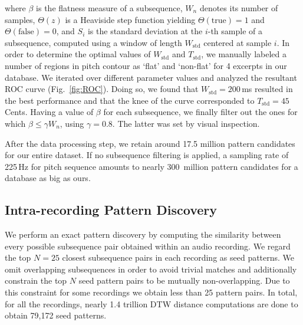 \noindent where $\beta$ is the flatness measure of a subsequence, $W_n$ denotes its number of samples, $\Theta(z)$ is a Heaviside step function yielding $\Theta(\text{true})\!=\!1$ and $\Theta(\text{false})\!=\!0$, and $S_i$ is the standard deviation at the $i$-th sample of a subsequence, computed using a window of length $W_{\text{std}}$ centered at sample $i$. %
In order to determine the optimal values of $W_{\text{std}}$ and $T_{\text{std}}$, we manually labeled a number of regions in pitch contour as `flat' and `non-flat' for 4 excerpts in our database. We iterated over different parameter values and analyzed the resultant ROC curve (Fig.~\ref{fig:ROC}). %
Doing so, we found that $W_{\text{std}}=200$\,ms resulted in the best performance and that the knee of the curve corresponded to $T_{\text{std}}=45$\,Cents. Having a value of $\beta$ for each subsequence, we finally filter out the ones for which $\beta \leq \gamma W_n$, using $\gamma = 0.8$. The latter was set by visual inspection.



After the data processing step, we retain around 17.5 million pattern candidates for our entire dataset. If no subsequence filtering is applied, a sampling rate of 225\,Hz for pitch sequence amounts to nearly 300~million pattern candidates for a database as big as ours.

\subsection{Intra-recording Pattern Discovery}
\label{sec:intraRecordingPatternDiscovery}

We perform an exact pattern discovery by computing the similarity between every possible subsequence pair obtained within an audio recording. We regard the top $N=25$ closest subsequence pairs in each recording as seed patterns. We omit overlapping subsequences in order to avoid trivial matches and additionally constrain the top $N$ seed pattern pairs to be mutually non-overlapping. Due to this constraint for some recordings we obtain less than 25 pattern pairs. In total, for all the recordings, nearly 1.4 trillion DTW distance computations are done to obtain 79,172 seed patterns.

